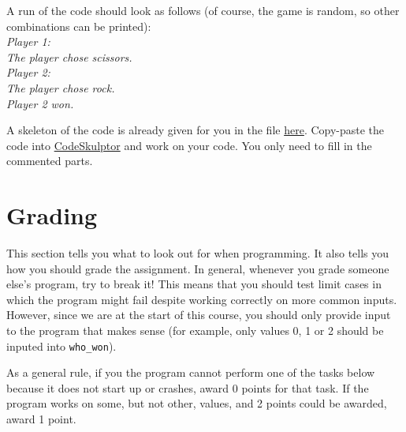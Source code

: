 \documentclass[11pt, a4paper]{article}
\begin{document}
A run of the code should look as follows (of course, the game is random, so other combinations can be printed):\\
\noindent \textit{
Player 1:\\
The player chose scissors.\\
Player 2:\\
The player chose rock.\\
Player 2 won.}

A skeleton of the code is already given for you in the file \href{https://github.com/BasicProbability/Programming2018/blob/master/weekly%20tasks/week%201/homework/code/start_code.py}{here}. Copy-paste the code into \href{http://py3.codeskulptor.org/}{CodeSkulptor} and work on your code. You only need to fill in the commented parts.

\section{Grading}
This section tells you what to look out for when programming. It also tells you how you should grade the assignment. In general, whenever you grade 
someone else's program, try to break it! This means that you should test limit cases in which the program might fail despite working correctly
on more common inputs. However, since we are at the start of this course, you should only provide input
to the program that makes sense (for example, only values 0, 1 or 2 should be inputed into \texttt{who\_won}).

As a general rule, if you the program cannot perform one of the tasks below because it does not start up or crashes, award 0 points for that task. If the program works on some, but not other, values, and 2 points could be awarded, award 1 point.

\enlargethispage{1cm}
\end{document}
